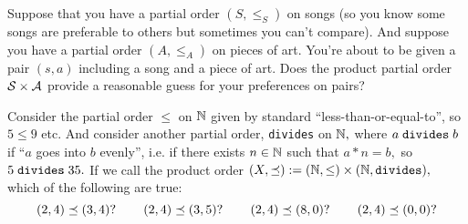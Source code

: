 \documentclass[CT4S-EN-RU]{subfiles}
\begin{document}
\begin{exampleRUS}\label{ex:product of preorders}
\end{exampleRUS}

\begin{exerciseENG}
Suppose that you have a partial order $(S,\leq_S)$ on songs (so you know some songs are preferable to others but sometimes you can't compare). And suppose you have a partial order $(A,\leq_A)$ on pieces of art. You're about to be given a pair $(s,a)$ including a song and a piece of art. Does the product partial order $\mathcal{S}\times\mathcal{A}$ provide a reasonable guess for your preferences on pairs?  
\end{exerciseENG}

\begin{exerciseRUS}
\end{exerciseRUS}

\begin{exerciseENG}\label{exc:divides as po}
Consider the partial order $\leq$ on ${\mathbb N}$ given by standard “less-than-or-equal-to”, so $5\leq 9$ etc. And consider another partial order, {\tt divides} on ${\mathbb N},$ where $a\;{\tt divides}\;b$ if “$a$ goes into $b$ evenly”, i.e. if there exists $n\in{\mathbb N}$ such that $a*n=b,$ so $5\;{\tt divides}\;35.$ If we call the product order $(X,\preceq):=({\mathbb N},\leq)\times({\mathbb N},{\tt divides}),$ which of the following are true: 
$$(2,4)\preceq(3,4)? \hspace{.3in} (2,4)\preceq(3,5)?\hspace{.3in} (2,4)\preceq (8,0)?\hspace{.3in} (2,4)\preceq(0,0)?$$
\end{exerciseENG}

\begin{exerciseRUS}\label{exc:divides as po}
\end{exerciseRUS}
\end{document}
